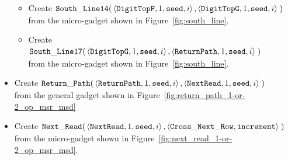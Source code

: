 \begin{itemize}
\begin{itemize}
        \item Create
        $\begin{aligned}[t]
            {\tt South\_Line14}(& \left\langle {\tt DigitTopF}, 1, {\tt seed}, i\right\rangle,
                                  \left\langle {\tt DigitTopG}, 1, {\tt seed}, i\right\rangle \;)
        \end{aligned}$\\ from the micro-gadget shown in Figure~\ref{fig:south_line}.

        \item Create
        $\begin{aligned}[t]
            {\tt South\_Line17}(& \left\langle {\tt DigitTopG}, 1, {\tt seed}, i \right\rangle,
                                  \left\langle {\tt ReturnPath}, 1, {\tt seed}, i  \right\rangle \;)
        \end{aligned}$\\from the micro-gadget shown in Figure~\ref{fig:south_line}.
    \end{itemize}

    \item Create
    $\begin{aligned}[t]
            {\tt Return\_Path}(&\left\langle {\tt ReturnPath}, 1, {\tt seed}, i \right\rangle,
                         \left\langle {\tt NextRead},   1, {\tt seed}, i \right\rangle \;)
    \end{aligned}$\\from the general gadget shown in Figure~\ref{fig:return_path_1-or-2_op_msr_msd}


    \item Create
    $\begin{aligned}[t]
        {\tt Next\_Read}(& \left\langle {\tt NextRead}, 1,      {\tt seed}, i  \right\rangle,
                    \left\langle {\tt Cross\_Next\_Row}, {\tt increment}\right\rangle \;)
    \end{aligned}$\\from the micro-gadget shown in Figure~\ref{fig:next_read_1-or-2_op_msr_msd}.
\end{itemize}



